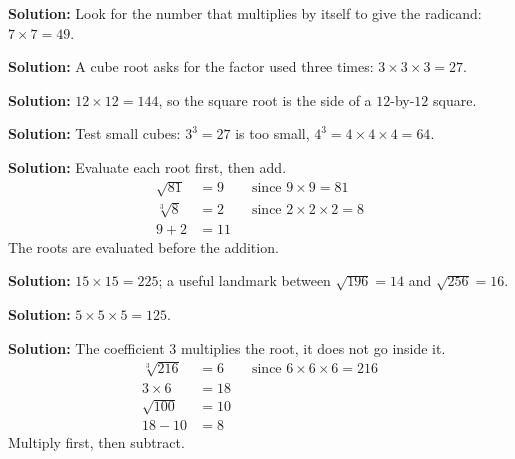 \documentclass[12pt]{article}
\begin{document}




\textbf{Solution:} \quad Look for the number that multiplies by itself to give the
radicand: $7 \times 7 = 49$. 


\textbf{Solution:} \quad A cube root asks for the factor used three times:
$3 \times 3 \times 3 = 27$. 


\textbf{Solution:} \quad $12 \times 12 = 144$, so the square root is the side of a
$12$-by-$12$ square. 


\textbf{Solution:} \quad Test small cubes: $3^3 = 27$ is too small, $4^3 = 4 \times 4
\times 4 = 64$. 


\textbf{Solution:} \quad Evaluate each root first, then add.
\begin{align*}
  \sqrt{81} &= 9 \qquad \text{since } 9 \times 9 = 81 \\
  \sqrt[3]{8} &= 2 \qquad \text{since } 2 \times 2 \times 2 = 8 \\
  9 + 2 &= 11
\end{align*}
The roots are evaluated before the addition. 


\textbf{Solution:} \quad $15 \times 15 = 225$; a useful landmark between
$\sqrt{196} = 14$ and $\sqrt{256} = 16$. 


\textbf{Solution:} \quad $5 \times 5 \times 5 = 125$. 


\textbf{Solution:} \quad The coefficient $3$ multiplies the root, it does not go
inside it.
\begin{align*}
  \sqrt[3]{216} &= 6 \qquad \text{since } 6 \times 6 \times 6 = 216 \\
  3 \times 6 &= 18 \\
  \sqrt{100} &= 10 \\
  18 - 10 &= 8
\end{align*}
Multiply first, then subtract. 
\end{document}
